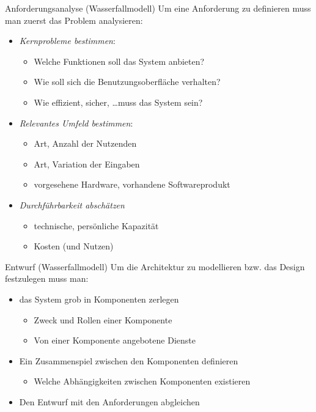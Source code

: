 \begin{bonus}{Anforderungsanalyse (Wasserfallmodell)}
    Um eine Anforderung zu definieren muss man zuerst das Problem analysieren:
    \begin{itemize}
        \item \emph{Kernprobleme bestimmen}:
              \begin{itemize}
                  \item Welche Funktionen soll das System anbieten?
                  \item Wie soll sich die Benutzungsoberfläche verhalten?
                  \item Wie effizient, sicher, \ldots muss das System sein?
              \end{itemize}
        \item \emph{Relevantes Umfeld bestimmen}:
              \begin{itemize}
                  \item Art, Anzahl der Nutzenden
                  \item Art, Variation der Eingaben
                  \item vorgesehene Hardware, vorhandene Softwareprodukt
              \end{itemize}
        \item \emph{Durchführbarkeit abschätzen}
              \begin{itemize}
                  \item technische, persönliche Kapazität
                  \item Kosten (und Nutzen)
              \end{itemize}
    \end{itemize}
\end{bonus}

\begin{bonus}{Entwurf (Wasserfallmodell)}
    Um die Architektur zu modellieren bzw. das Design festzulegen muss man:
    \begin{itemize}
        \item das System grob in Komponenten zerlegen
              \begin{itemize}
                  \item Zweck und Rollen einer Komponente
                  \item Von einer Komponente angebotene Dienste
              \end{itemize}
        \item Ein Zusammenspiel zwischen den Komponenten definieren
              \begin{itemize}
                  \item Welche Abhängigkeiten zwischen Komponenten existieren
              \end{itemize}
        \item Den Entwurf mit den Anforderungen abgleichen
    \end{itemize}
\end{bonus}

